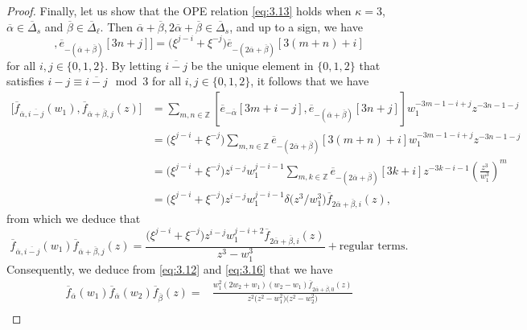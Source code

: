 \documentclass[10pt,a4paper]{amsart}
\numberwithin{equation}{section}
\begin{document}
\begin{proof}
Finally, let us show that the OPE relation \eqref{eq:3.13} holds when $\kappa=3$, $\overline{\alpha}\in\overline{\Delta}_s$ and $\overline{\beta}\in\overline{\Delta}_{\ell}$. Then $\overline{\alpha}+\overline{\beta},2\overline{\alpha}+\overline{\beta}\in\overline{\Delta}_s$, and up to a sign, we have
\begin{equation*}
[\overline{e}_{-\overline{\alpha}}[3m+i-j],\overline{e}_{-(\overline{\alpha}+\overline{\beta})}[3n+j]]
=\bigl(\xi^{j-i}+\xi^{-j}\bigr)\overline{e}_{-(2\overline{\alpha}+ \overline{\beta})}[3(m+n)+i]
\end{equation*}
for all $i,j\in\{0,1,2\}$. By letting $\overline{i-j}$ be the unique element in $\{0,1,2\}$ that satisfies $i-j\equiv \overline{i-j}\mod 3$ for all $i,j\in\{0,1,2\}$, it follows that we have
\begin{align*}
\bigl[\overline{f}_{\overline{\alpha},\overline{i-j}}(w_1), \overline{f}_{\overline{\alpha}+\overline{\beta},j}(z)\bigr]
&=\sum_{m,n\in\mathbb{Z}}[\overline{e}_{-\overline{\alpha}}[3m+i-j],\overline{e}_{-(\overline{\alpha}+\overline{\beta})}[3n+j]]w_1^{-3m-1-i+j}z^{-3n-1-j}\\
&=\bigl(\xi^{j-i}+\xi^{-j}\bigr)\sum_{m,n\in\mathbb{Z}}\overline{e}_{-(2\overline{\alpha}+\overline{\beta})}[3(m+n)+i]w_1^{-3m-1-i+j}z^{-3n-1-j}\\
&=\bigl(\xi^{j-i}+\xi^{-j}\bigr)z^{i-j}w_1^{j-i-1} \sum_{m,k\in\mathbb{Z}}\overline{e}_{-(2\overline{\alpha}+ \overline{\beta})}[3k+i]z^{-3k-i-1}\left(\frac{z^3}{w_1^3} \right)^m\\
&=\bigl(\xi^{j-i}+\xi^{-j}\bigr)z^{i-j}w_1^{j-i-1}\delta\bigl(z^3/w_1^3\bigr) \overline{f}_{2\overline{\alpha}+\overline{\beta},i}(z),
\end{align*}
from which we deduce that
\begin{equation}\label{eq:3.16}
\overline{f}_{\overline{\alpha},\overline{i-j}}(w_1)\overline{f}_{\overline{\alpha}+\overline{\beta},j}(z)
=\frac{\bigl(\xi^{j-i}+\xi^{-j}\bigr)z^{i-j}w_1^{j-i+2} \overline{f}_{2\overline{\alpha}+\overline{\beta},i}(z)}{z^3-w_1^3}+\text{regular terms}.
\end{equation}
Consequently, we deduce from \eqref{eq:3.12} and \eqref{eq:3.16} that we have
\begin{align}
\overline{f}_{\overline{\alpha}}(w_1) \overline{f}_{\overline{\alpha}}(w_2)
\overline{f}_{\overline{\beta}}(z)
={}&\frac{w_1^2(2w_2+w_1)(w_2-w_1)\overline{f}_{ 2\overline{\alpha}+\overline{\beta},0}(z)}{z^2\bigl(z^2-w_1^2\bigr)\bigl(z^2-w_2^2\bigr)}\nonumber\\

\end{align}
\end{proof}
\end{document}

